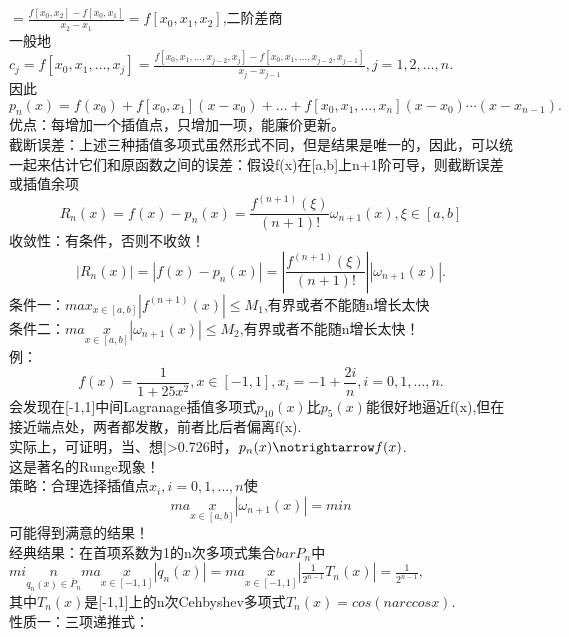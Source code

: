 \documentclass[a4paper,12pt]{article}
\begin{document}
\begin{CJK*}{UTF8}{gbsn}
	$=\frac{f[x_0,x_2]-f[x_0,x_1]}{x_2-x_1}=f[x_0,x_1,x_2]$,二阶差商\\
	一般地\\
	$c_j=f[x_0,x_1,\ldots,x_j]=\frac{f[x_0,x_1,\ldots,x_{j-2},x_j]-f[x_0,x_1,\ldots,x_{j-2},x_{j-1}]}{x_j-x_{j-1}},j=1,2,\ldots,n.$\\
	因此$p_n(x) = f(x_0)+f[x_0,x_1](x-x_0)+\ldots+f[x_0,x_1,\ldots,x_n](x-x_0)\cdots(x-x_{n-1}).$\\
	优点：每增加一个插值点，只增加一项，能廉价更新。\\
	截断误差：上述三种插值多项式虽然形式不同，但是结果是唯一的，因此，可以统一起来估计它们和原函数之间的误差：假设f(x)在[a,b]上n+1阶可导，则截断误差或插值余项
	\begin{equation}
		R_n(x)=f(x)-p_n(x)=\frac{f^{(n+1)}(\xi)}{(n+1)!}\omega_{n+1}(x),\xi \in [a,b]
	\end{equation}
	收敛性：有条件，否则不收敛！
	\begin{equation}
		|R_n(x)|=|f(x)-p_n(x)|=|\frac{f^{(n+1)}(\xi)}{(n+1)!}||\omega_{n+1}(x)|.
	\end{equation}
	条件一：$max_{x\in[a,b]}|f^{(n+1)}(x)|\le M_1$,有界或者不能随n增长太快\\
	条件二：$max\limits_{x\in[a,b]}|\omega_{n+1}(x)|\le M_2$,有界或者不能随n增长太快！\\
	例：
	\begin{equation}
		f(x) = \frac{1}{1+25x^2},x\in[-1,1],x_i=-1+\frac{2i}{n},i=0,1,\ldots,n.
	\end{equation}
	会发现在[-1,1]中间Lagranage插值多项式$p_10(x)$比$p_5(x)$能很好地逼近f(x),但在接近端点处，两者都发散，前者比后者偏离f(x).\\
	实际上，可证明，当、想|>0.726时，$p_n(x) \notrightarrow f(x)$.\\
	这是著名的Runge现象！\\
	策略：合理选择插值点$x_i,i=0,1,\ldots,n$使
	\begin{equation}
		max\limits_{x\in[a,b]}|\omega_{n+1}(x)|=min
	\end{equation}
	可能得到满意的结果！\\
	经典结果：在首项系数为1的n次多项式集合$bar{P}_n$中\\
	$min\limits_{q_n(x)\in\bar{P}_n}max\limits_{x\in[-1,1]}|q_n(x)| = max\limits_{x\in[-1,1]}|\frac{1}{2^{n-1}}T_n(x)|=\frac{1}{2^{n-1}},$\\
	其中$T_n(x)$是[-1,1]上的n次Cehbyshev多项式$T_n(x)=cos(narccosx).$\\
	性质一：三项递推式：\\

\end{CJK*}
\end{document}
